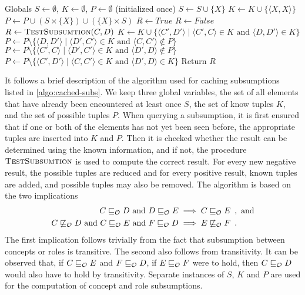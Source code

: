 \begin{algorithm}[ht]
  \begin{algorithmic}
    \State Globals \enspace $S \gets \emptyset$, \enspace $K \gets \emptyset$, \enspace $P \gets \emptyset$ \quad (initialized once)
      \State $S \gets S \cup \{ X \}$
      \State $K \gets K \cup \{ \langle X, X \rangle \}$
      \State $P \gets P \cup ( S \times \{ X \} ) \cup ( \{ X \} \times S )$
    \EndFor
      \State $R \gets \mathit{True}$
      \State $R \gets \mathit{False}$
    \Else
      \State $R \gets \textsc{TestSubsumtion}(C, D)$
        \State $K \gets K \cup \{ \langle C', D' \rangle \mid \langle C', C \rangle \in K \text{ and } \langle D, D' \rangle \in K \}$
        \State $P \gets P \setminus \{ \langle D, D' \rangle \mid \langle D', C' \rangle \in K \text{ and } \langle C, C' \rangle \not\in P \}$
        \State $P \gets P \setminus \{ \langle C', C \rangle \mid \langle D', C' \rangle \in K \text{ and } \langle D', D \rangle \not\in P \}$
      \Else
        \State $P \gets P \setminus \{ \langle C', D' \rangle \mid \langle C, C' \rangle \in K \text{ and } \langle D', D \rangle \in K \}$
      \EndIf
    \EndIf
    \State Return $R$
  \end{algorithmic}
  \caption{$\textsc{CachedTestSubsumtion}(C, D)$}
  \label{algo:cached-subs}
\end{algorithm}

It follows a brief description of the algorithm used for caching subsumptions listed in \cref{algo:cached-subs}. We keep three global variables, the set of all elements that have already been encountered at least once $S$, the set of know tuples $K$, and the set of possible tuples $P$. When querying a subsumption, it is first ensured that if one or both of the elements has not yet been seen before, the appropriate tuples are inserted into $K$ and $P$. Then it is checked whether the result can be determined using the known information, and if not, the procedure $\textsc{TestSubsumtion}$ is used to compute the correct result. For every new negative result, the possible tuples are reduced and for every positive result, known tuples are added, and possible tuples may also be removed. The algorithm is based on the two implications
\begin{align*}
  C \sqsubseteq_\mathcal{O} D \text{ and } D \sqsubseteq_\mathcal{O} E &\implies C \sqsubseteq_\mathcal{O} E \enspace,\text{ and} \\
  C \not\sqsubseteq_\mathcal{O} D \text{ and } C \sqsubseteq_\mathcal{O} E \text{ and } F \sqsubseteq_\mathcal{O} D &\implies E \not\sqsubseteq_\mathcal{O} F \enspace.
\end{align*}
The first implication follows trivially from the fact that subsumption between concepts or roles is transitive. The second also follows from transitivity. It can be observed that, if $C \sqsubseteq_\mathcal{O} E$ and $F \sqsubseteq_\mathcal{O} D$, if $E \sqsubseteq_\mathcal{O} F$ were to hold, then $C \sqsubseteq_\mathcal{O} D$ would also have to hold by transitivity. Separate instances of $S$, $K$ and $P$ are used for the computation of concept and role subsumptions.

